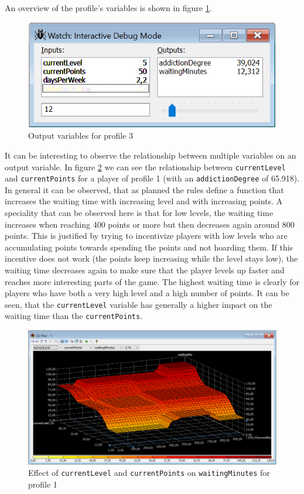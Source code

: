 An overview of the profile's variables is shown in figure \ref{fig:prof3}.

\begin{figure}[H]
\centering
\includegraphics[width=\textwidth]{img/profile3}
\caption{Output variables for profile 3}
\label{fig:prof3} 
\end{figure}

It can be interesting to observe the relationship between multiple variables on an output variable. In figure \ref{fig:prof1_3d} we can see the relationship between \texttt{currentLevel} and \texttt{currentPoints} for a player of profile 1 (with an \texttt{addictionDegree} of 65.918). In general it can be observed, that as planned the rules define a function that increases the waiting time with increasing level and with increasing points. A speciality that can be observed here is that for low levels, the waiting time increases when reaching 400 points or more but then decreases again around 800 points. This is justified by trying to incentivize players with low levels who are accumulating points towards spending the points and not hoarding them. If this incentive does not work (the points keep increasing while the level stays low), the waiting time decreases again to make sure that the player levels up faster and reaches more interesting parts of the game. The highest waiting time is clearly for players who have both a very high level and a high number of points. It can be seen, that the \texttt{currentLevel} variable has generally a higher impact on the waiting time than the \texttt{currentPoints}.


\begin{figure}[H]
\centering
\includegraphics[width=\textwidth]{img/profile1_3d}
\caption{Effect of \texttt{currentLevel} and \texttt{currentPoints} on \texttt{waitingMinutes} for profile 1}
\label{fig:prof1_3d} 
\end{figure}

